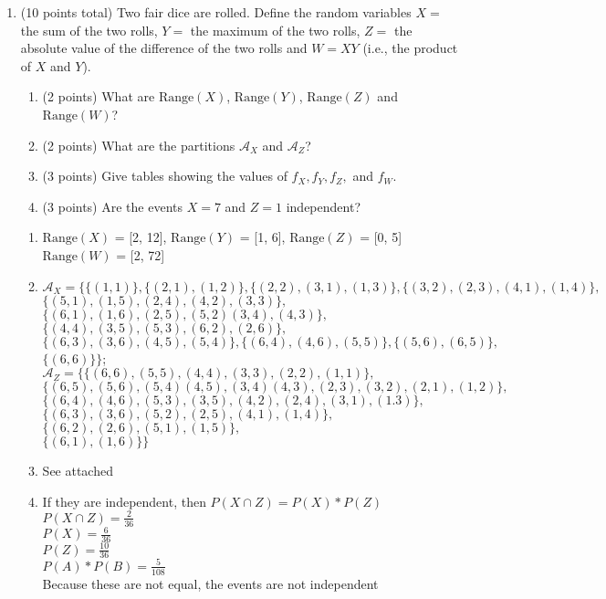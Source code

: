 \documentclass[11pt]{article}
\newcommand{\Range}{{\mathrm{Range}}}
\newcommand{\A}{{\mathcal{A}}}
\begin{document}
\begin{enumerate}
\item (10 points total) Two fair dice are rolled.  Define the random variables
$X =$ the sum of the two rolls,
$Y =$ the maximum of the two rolls,
$Z =$ the absolute value of the difference of the two rolls
and $W = XY$ (i.e., the product of $X$ and $Y$).
\begin{enumerate}
 \item (2 points) What are $\Range(X)$, $\Range(Y)$, $\Range(Z)$ and
 $\Range(W)$?

 \item (2 points) What are the partitions $\A_X$ and $\A_Z$?
 \item (3 points) Give tables showing the values of $f_X,f_Y,f_Z,$ and $f_W$.
 \item (3 points) Are the events $X =7$ and $Z=1$ independent?
\end{enumerate}

\begin{enumerate}
	\item $\Range(X)$ = [2, 12], $\Range(Y)$ = [1, 6], $\Range(Z)$ = [0, 5]
	$\Range(W)$ = [2, 72]
	\item $\A_X = \{\{(1,1)\}, \{(2,1),(1,2)\}, \{(2,2),(3,1),(1,3)\}, 
	\{(3,2),(2,3),(4,1),(1,4)\}, $\\$\{(5,1),(1,5),(2,4),(4,2),(3,3)\}, 
	$\\$\{(6,1),(1,6),(2,5),(5,2)(3,4),(4,3)\}, $\\$
	\{(4,4),(3,5),(5,3),(6,2),(2,6)\}, $\\$
	\{(6,3),(3,6),(4,5),(5,4)\}, \{(6,4),(4,6),(5,5)\}, \{(5,6),(6,5)\}, $\\$
	\{(6,6)\}\}$; \\
	$\A_Z = \{\{(6,6),(5,5),(4,4),(3,3),(2,2),(1,1)\}, $\\$
	\{(6,5),(5,6),(5,4)(4,5),(3,4)(4,3),(2,3),(3,2),(2,1),(1,2)\}, $\\$
	\{(6,4),(4,6),(5,3),(3,5),(4,2),(2,4),(3,1),(1.3)\}, $\\$
	\{(6,3),(3,6),(5,2),(2,5),(4,1),(1,4)\},$\\$
	\{(6,2),(2,6),(5,1),(1,5)\},$\\$
	\{(6,1),(1,6)\}\}$
	\item See attached
	\item If they are independent, then $P(X \cap Z) = P(X) * P(Z)$ \\ 
	$P(X \cap Z) = \frac{2}{36}$ \\
	$P(X) = \frac{6}{36}$ \\
	$P(Z) = \frac{10}{36}$ \\
	$P(A)*P(B) = \frac{5}{108}$ \\
	Because these are not equal, the events are not independent
\end{enumerate}


\end{enumerate}
\end{document}

